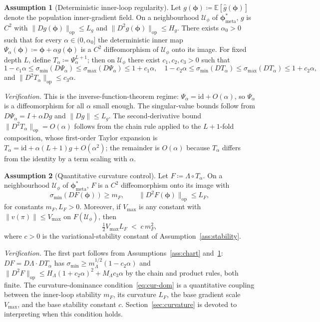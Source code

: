\documentclass[11pt]{article}
\theoremstyle{definition}
\newtheorem{assumption}{Assumption}
\theoremstyle{remark}
\newcommand{\meta}{\mathrm{meta}}
\newcommand{\E}{\mathbb{E}}
\newcommand{\defeq}{\coloneqq}
\begin{document}
\begin{assumption}[Deterministic inner-loop regularity]\label{ass:inner}
Let $g(\bm\phi)\defeq\E[\hat g(\bm\phi)]$ denote the population inner-gradient
field.  On a neighbourhood $\mathcal U_\phi$ of $\bm\phi_\meta^*$, $g$ is
$C^2$ with
$\|Dg(\bm\phi)\|_{\mathrm{op}}\le L_g$ and
$\|D^2g(\bm\phi)\|_{\mathrm{op}}\le H_g$.
There exists $\alpha_0>0$ such that for every $\alpha\in(0,\alpha_0]$
the deterministic inner map $\Psi_\alpha(\bm\phi)\defeq\bm\phi+\alpha g(\bm\phi)$
is a $C^2$ diffeomorphism of $\mathcal U_\phi$ onto its image.  For fixed
depth $L$, define $T_\alpha\defeq\Psi_\alpha^{L+1}$; then on
$\mathcal U_\phi$ there exist $c_1,c_2,c_3>0$ such that
\[
  1-c_1\alpha\le\sigma_{\min}(D\Psi_\alpha)\le\sigma_{\max}(D\Psi_\alpha)\le 1+c_1\alpha,\quad
  1-c_2\alpha\le\sigma_{\min}(DT_\alpha)\le\sigma_{\max}(DT_\alpha)\le 1+c_2\alpha,
\]
and $\|D^2T_\alpha\|_{\mathrm{op}}\le c_3\alpha$.
\end{assumption}

\emph{Verification.}  This is the inverse-function-theorem regime:
$\Psi_\alpha=\mathrm{id}+O(\alpha)$, so $\Psi_\alpha$ is a diffeomorphism for
all $\alpha$ small enough.  The singular-value bounds follow from
$D\Psi_\alpha=I+\alpha Dg$ and $\|Dg\|\le L_g$.  The second-derivative
bound $\|D^2T_\alpha\|_{\mathrm{op}}=O(\alpha)$ follows from the chain
rule applied to the $L+1$-fold composition, whose first-order Taylor
expansion is $T_\alpha=\mathrm{id}+\alpha(L+1)g+O(\alpha^2)$; the remainder
is $O(\alpha)$ because $T_\alpha$ differs from the identity by a term
scaling with $\alpha$.

\begin{assumption}[Quantitative curvature control]\label{ass:curvature}
Let $F\defeq\Lambda\circ T_\alpha$.  On a neighbourhood $\mathcal U_\phi$
of $\bm\phi_\meta^*$, $F$ is a $C^2$ diffeomorphism onto its image with
\[
  \sigma_{\min}(DF(\bm\phi))\ge m_F,\qquad \|D^2F(\bm\phi)\|_{\mathrm{op}}\le L_F,
\]
for constants $m_F,L_F>0$.  Moreover, if $V_{\max}$ is any constant
with $\|v(\pi)\|\le V_{\max}$ on $F(\mathcal U_\phi)$, then
\begin{equation}
  \tfrac{1}{2}V_{\max}L_F\;<\;c\,m_F^2,
  \label{eq:cur-dom}
\end{equation}
where $c>0$ is the variational-stability constant of
Assumption~\ref{ass:stability}.
\end{assumption}

\emph{Verification.}  The first part follows from
Assumptions~\ref{ass:chart} and~\ref{ass:inner}: $DF=D\Lambda\cdot DT_\alpha$
has $\sigma_{\min}\ge m_\Lambda^{1/2}(1-c_2\alpha)$ and
$\|D^2F\|_{\mathrm{op}}\le H_\Lambda(1+c_2\alpha)^2+M_\Lambda c_3\alpha$
by the chain and product rules, both finite.  The
curvature-dominance condition~\eqref{eq:cur-dom} is a quantitative
coupling between the inner-loop stability $m_F$, its curvature $L_F$,
the base gradient scale $V_{\max}$, and the base stability constant
$c$.  Section~\ref{sec:curvature} is devoted to interpreting when this
condition holds.
\end{document}
